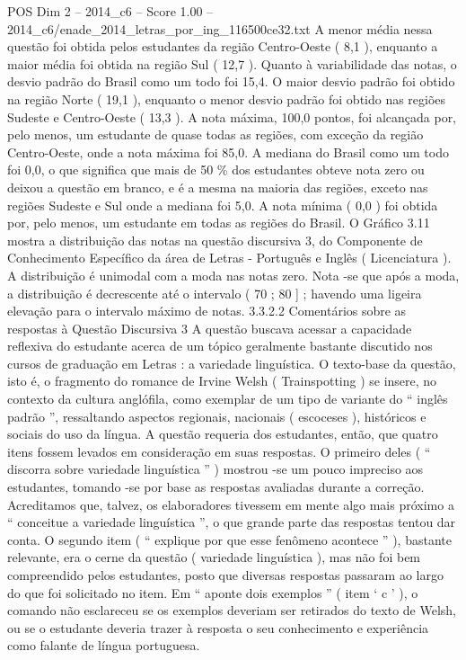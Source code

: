 \begin{textsample}{POS Dim 2 – 2014\_c6 – Score 1.00 – 2014\_c6/enade\_2014\_letras\_por\_ing\_116500ce32.txt}
A menor média nessa questão foi obtida pelos estudantes da região Centro-Oeste ( 8,1 ), enquanto a maior média foi obtida na região Sul ( 12,7 ).
Quanto à variabilidade das notas, o desvio padrão do Brasil como um todo foi 15,4.
O maior desvio padrão foi obtido na região Norte ( 19,1 ), enquanto o menor desvio padrão foi obtido nas regiões Sudeste e Centro-Oeste ( 13,3 ).
A nota máxima, 100,0 pontos, foi alcançada por, pelo menos, um estudante de quase todas as regiões, com exceção da região Centro-Oeste, onde a nota máxima foi 85,0.
A mediana do Brasil como um todo foi 0,0, o que significa que mais de 50 \% dos estudantes obteve nota zero ou deixou a questão em branco, e é a mesma na maioria das regiões, exceto nas regiões Sudeste e Sul onde a mediana foi 5,0.
A nota mínima ( 0,0 ) foi obtida por, pelo menos, um estudante em todas as regiões do Brasil.
O Gráfico 3.11 mostra a distribuição das notas na questão discursiva 3, do Componente de Conhecimento Específico da área de Letras - Português e Inglês ( Licenciatura ).
A distribuição é unimodal com a moda nas notas zero.
Nota -se que após a moda, a distribuição é decrescente até o intervalo ( 70 ; 80 ] ; havendo uma ligeira elevação para o intervalo máximo de notas. 3.3.2.2 Comentários sobre as respostas à Questão Discursiva 3 A questão buscava acessar a capacidade reflexiva do estudante acerca de um tópico geralmente bastante discutido nos cursos de graduação em Letras : a variedade linguística.
O texto-base da questão, isto é, o fragmento do romance de Irvine Welsh ( Trainspotting ) se insere, no contexto da cultura anglófila, como exemplar de um tipo de variante do “ inglês padrão ”, ressaltando aspectos regionais, nacionais ( escoceses ), históricos e sociais do uso da língua.
A questão requeria dos estudantes, então, que quatro itens fossem levados em consideração em suas respostas.
O primeiro deles ( “ discorra sobre variedade linguística ” ) mostrou -se um pouco impreciso aos estudantes, tomando -se por base as respostas avaliadas durante a correção.
Acreditamos que, talvez, os elaboradores tivessem em mente algo mais próximo a “ conceitue a variedade linguística ”, o que grande parte das respostas tentou dar conta.
O segundo item ( “ explique por que esse fenômeno acontece ” ), bastante relevante, era o cerne da questão ( variedade linguística ), mas não foi bem compreendido pelos estudantes, posto que diversas respostas passaram ao largo do que foi solicitado no item.
Em “ aponte dois exemplos ” ( item ‘ c ’ ), o comando não esclareceu se os exemplos deveriam ser retirados do texto de Welsh, ou se o estudante deveria trazer à resposta o seu conhecimento e experiência como falante de língua portuguesa.

\end{textsample}
